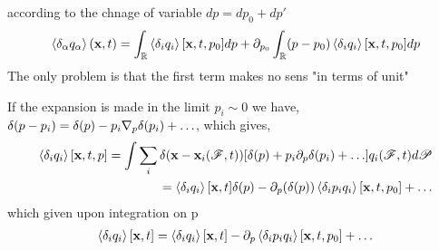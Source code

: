 according to the chnage of variable $dp = dp_0 +dp'$ 
\begin{equation}
    \left<\delta_\alpha q_\alpha\right>(\textbf{x},t)
    = \int_\mathbb{R} \left<\delta_i q_i\right>[\textbf{x},t,p_0] dp
    + \partial_{p_0} \int_\mathbb{R} (p - p_0)  \left<\delta_i q_i\right>[\textbf{x},t,p_0] dp
\end{equation}
The only problem is that the first term makes no sens "in terms of unit"


If the expansion is made in the limit $p_i \sim 0$ we have, 
$\delta(p-p_i) = \delta(p) - p_i \mathbf{\nabla}_p \delta(p_i) + \ldots$,
which gives, 
\begin{align}
    \left<\delta_i q_i\right>[\textbf{x},t,p]
    = \int \sum_i 
    \delta(\textbf{x} - \textbf{x}_i(\mathscr{F},t)) 
     [\delta(p)
    + p_i \partial_p \delta(p_i  )
    + \ldots]
    q_i(\mathscr{F},t) d\mathscr{P}\\
    =
    \left<\delta_i q_i\right>[\textbf{x},t]\delta(p)
    - \partial_{p}(\delta(p))\left<\delta_i p_i q_i\right>[\textbf{x},t,p_0] 
    + \ldots\\
\end{align}
which given upon integration on p
\begin{align}
    \left<\delta_i q_i\right>[\textbf{x},t]
    =
    \left<\delta_i q_i\right>[\textbf{x},t]
    - \partial_{p}\left<\delta_i p_i q_i\right>[\textbf{x},t,p_0] 
    + \ldots\\
\end{align}